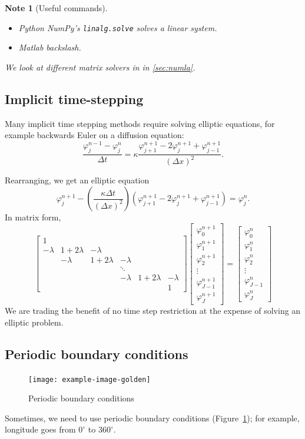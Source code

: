 \documentclass[11pt, a4paper]{article}
\renewcommand{\phi}{\varphi}
\theoremstyle{break}
\newtheorem{note}[thm]{Note}
\newcommand*{\Paren}[1]{\left(#1\right)}%
\newcommand{\dt}{\Delta t}
\newcommand{\dx}{\Delta x}
\begin{document}
\begin{note}[Useful commands]\
	\vspace{-2em}\begin{itemize}\itemsep0em
		\item Python NumPy's \lstinline|linalg.solve| solves a linear system.
		\item Matlab backslash.
	\end{itemize}
	We look at different matrix solvers in in \ref{sec:numla}.
\end{note}


\subsection{Implicit time-stepping}

Many implicit time stepping methods require solving elliptic equations, for example backwards Euler on a diffusion equation: \[\frac{\phi_j^{n-1}-\phi_j^n}{\dt}=\kappa\frac{\phi_{j+1}^{n+1}-2\phi_j^{n+1}+\phi_{j-1}^{n+1}}{(\dx)^2}.\]

Rearranging, we get an elliptic equation \[\phi_j^{n+1}-\Paren{\frac{\kappa\dt}{(\dx)^2}}\Paren{\phi_{j+1}^{n+1}-2\phi_j^{n+1}+\phi^{n+1}_{j-1}}=\phi_j^n.\] In matrix form,
\[\begin{bmatrix}
	1&\\-\lambda &1+2\lambda &-\lambda\\&-\lambda &1+2\lambda &-\lambda\\&&&\ddots\\&&&-\lambda &1+2\lambda &-\lambda \\&&&&&1
\end{bmatrix}\begin{bmatrix}
\phi_0^{n+1}\\\phi_1^{n+1}\\\phi_2^{n+1}\\\vdots\\\phi_{J-1}^{n+1}\\\phi_J^{n+1}
\end{bmatrix}=\begin{bmatrix}
\phi_0^{n}\\\phi_1^{n}\\\phi_2^{n}\\\vdots\\\phi_{J-1}^{n}\\\phi_J^{n}
\end{bmatrix}\]
We are trading the benefit of no time step restriction at the expense of solving an elliptic problem.
\subsection{Periodic boundary conditions}
\begin{figure}\centering
	\texttt{[image: example-image-golden]}
	\caption{Periodic boundary conditions}\label{fig:periodicBC}
\end{figure}
Sometimes, we need to use periodic boundary conditions (Figure~\ref{fig:periodicBC}); for example, longitude goes from $0^\circ$ to $360^\circ$.
\end{document}
